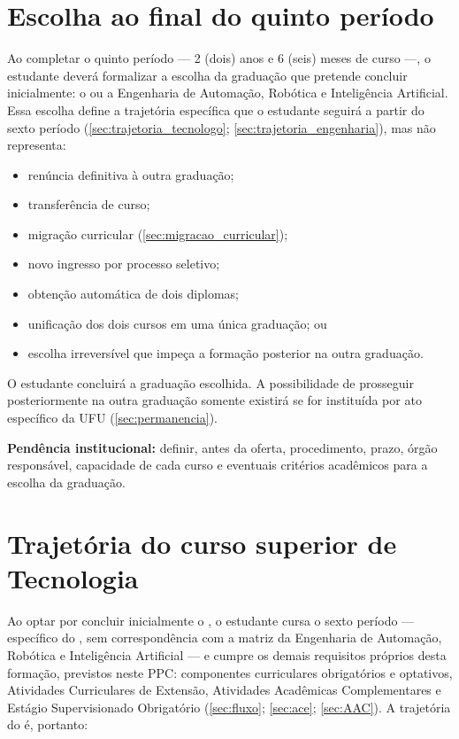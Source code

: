 \section{Escolha ao final do quinto período}
\label{sec:escolha}

Ao completar o quinto período — 2 (dois) anos e 6 (seis) meses de curso —, o estudante deverá formalizar a escolha da graduação que pretende concluir inicialmente: o \ppccurso ou a Engenharia de Automação, Robótica e Inteligência Artificial. Essa escolha define a trajetória específica que o estudante seguirá a partir do sexto período (\autoref{sec:trajetoria_tecnologo}; \autoref{sec:trajetoria_engenharia}), mas não representa:

\begin{itemize}
    \item renúncia definitiva à outra graduação;
    \item transferência de curso;
    \item migração curricular (\autoref{sec:migracao_curricular});
    \item novo ingresso por processo seletivo;
    \item obtenção automática de dois diplomas;
    \item unificação dos dois cursos em uma única graduação; ou
    \item escolha irreversível que impeça a formação posterior na outra graduação.
\end{itemize}

O estudante concluirá a graduação escolhida. A possibilidade de prosseguir posteriormente na outra graduação somente existirá se for instituída por ato específico da UFU (\autoref{sec:permanencia}).

\textbf{Pendência institucional:} definir, antes da oferta, procedimento, prazo, órgão responsável, capacidade de cada curso e eventuais critérios acadêmicos para a escolha da graduação.

\section{Trajetória do curso superior de Tecnologia}
\label{sec:trajetoria_tecnologo}

Ao optar por concluir inicialmente o \ppccurso, o estudante cursa o sexto período — específico do \ppccurso, sem correspondência com a matriz da Engenharia de Automação, Robótica e Inteligência Artificial — e cumpre os demais requisitos próprios desta formação, previstos neste PPC: componentes curriculares obrigatórios e optativos, Atividades Curriculares de Extensão, Atividades Acadêmicas Complementares e Estágio Supervisionado Obrigatório (\autoref{sec:fluxo}; \autoref{sec:ace}; \autoref{sec:AAC}). A trajetória do \ppccurso é, portanto:

